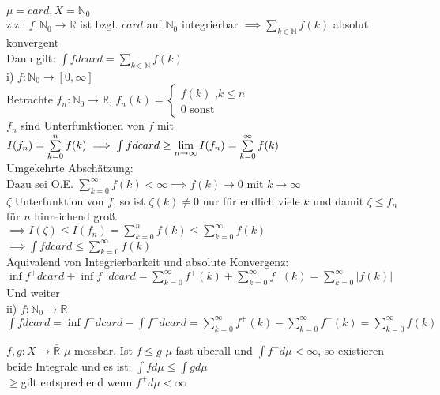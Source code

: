   \begin{example}
    $\mu = card, X = \mathbb{N}_0$\\
    z.z.: $f: \mathbb{N}_0 \to \mathbb{R}$ ist bzgl. $card$ auf $\mathbb{N}_0$ integrierbar $\implies \sum\limits_{k \in \mathbb{N}} f(k)$ absolut konvergent\\
    Dann gilt: $\int f d card = \sum\limits_{k \in \mathbb{N}} f(k)$\\
    
    i) $f: \mathbb{N}_0 \to [0,\infty]$ \\
    Betrachte $f_n: \mathbb{N}_0 \to \mathbb{R}$, $f_n(k) = \begin{cases} f(k) \text{ ,}k\leq n \\ 0\text{ sonst } \end{cases}$ \\
    $f_n$ sind Unterfunktionen von $f$ mit $I(f_n)=\sum\limits_{k=0}^nf(k) \\ \implies \int f dcard \geq \lim\limits_{n\to\infty} I(f_n) = \sum\limits_{k=0}^{\infty} f(k)$\\
    Umgekehrte Abschätzung: \\
    Dazu sei O.E. $\sum\limits_{k=0}^\infty f(k) <\infty \implies f(k)\to 0$ mit $k\to\infty$ \\
    $\zeta$ Unterfunktion von $f$, so ist $\zeta (k) \neq 0$ nur für endlich viele $k$ und damit $\zeta \leq f_n$ für $n$ hinreichend groß. \\
    $\implies I(\zeta)\leq I(f_n) = \sum\limits_{k=0}^n f(k)\leq \sum\limits_{k=0}^\infty f(k)$ \\
    $\implies \int f dcard \leq \sum\limits_{k=0}^\infty f(k)$ \\
    
    Äquivalend von Integrierbarkeit und absolute Konvergenz: \\
    $\inf f^+ dcard + \inf f^- dcard = \sum\limits_{k=0}^\infty f^+(k)+\sum\limits_{k=0}^\infty f^-(k) = \sum\limits_{k=0}^\infty |f(k)|$ \\
    Und weiter \\
    
    ii) $f: \mathbb{N}_0 \to \mathbb{\bar{R}}$ \\
    $\int f dcard = \inf f^+ dcard - \int f^- dcard = \sum\limits_{k=0}^\infty f^+(k) - \sum\limits_{k=0}^\infty f^-(k) = \sum\limits_{k=0}^\infty f(k)$
  \end{example}
  \newpage
  \begin{theorem}
    $f,g:X \to \bar{\mathbb{R}}$ $\mu$-messbar. Ist $f \leq g$ $\mu$-fast überall und $\int f^- d\mu < \infty$, so existieren beide Integrale und es ist: $\int f d\mu \leq \int g d\mu$\\
    \glqq$\geq$\grqq gilt entsprechend wenn $f^+ d\mu < \infty$
  \end{theorem}

